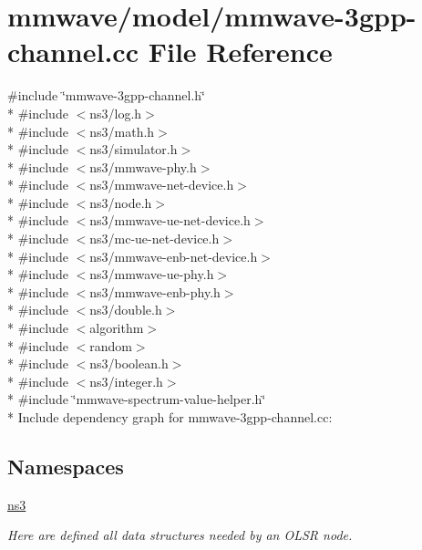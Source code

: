 \hypertarget{mmwave-3gpp-channel_8cc}{}\section{mmwave/model/mmwave-\/3gpp-\/channel.cc File Reference}
\label{mmwave-3gpp-channel_8cc}
{\ttfamily \#include \char`\"{}mmwave-\/3gpp-\/channel.\+h\char`\"{}}\\*
{\ttfamily \#include $<$ns3/log.\+h$>$}\\*
{\ttfamily \#include $<$ns3/math.\+h$>$}\\*
{\ttfamily \#include $<$ns3/simulator.\+h$>$}\\*
{\ttfamily \#include $<$ns3/mmwave-\/phy.\+h$>$}\\*
{\ttfamily \#include $<$ns3/mmwave-\/net-\/device.\+h$>$}\\*
{\ttfamily \#include $<$ns3/node.\+h$>$}\\*
{\ttfamily \#include $<$ns3/mmwave-\/ue-\/net-\/device.\+h$>$}\\*
{\ttfamily \#include $<$ns3/mc-\/ue-\/net-\/device.\+h$>$}\\*
{\ttfamily \#include $<$ns3/mmwave-\/enb-\/net-\/device.\+h$>$}\\*
{\ttfamily \#include $<$ns3/mmwave-\/ue-\/phy.\+h$>$}\\*
{\ttfamily \#include $<$ns3/mmwave-\/enb-\/phy.\+h$>$}\\*
{\ttfamily \#include $<$ns3/double.\+h$>$}\\*
{\ttfamily \#include $<$algorithm$>$}\\*
{\ttfamily \#include $<$random$>$}\\*
{\ttfamily \#include $<$ns3/boolean.\+h$>$}\\*
{\ttfamily \#include $<$ns3/integer.\+h$>$}\\*
{\ttfamily \#include \char`\"{}mmwave-\/spectrum-\/value-\/helper.\+h\char`\"{}}\\*
Include dependency graph for mmwave-\/3gpp-\/channel.cc\+:
\subsection*{Namespaces}
\begin{DoxyCompactItemize}
\item 
 \hyperlink{namespacens3}{ns3}
\begin{DoxyCompactList}\small\item\em Here are defined all data structures needed by an O\+L\+SR node. \end{DoxyCompactList}\end{DoxyCompactItemize}
